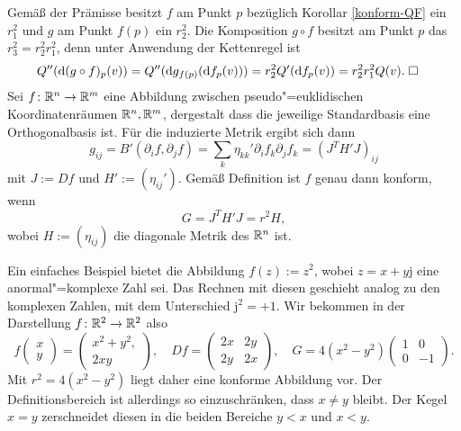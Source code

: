  Gemäß der Prämisse besitzt $f$ am Punkt $p$
bezüglich Korollar \ref{konform-QF} ein $r_1^2$ und $g$ am Punkt
$f(p)$ ein $r_2^2$. Die Komposition $g\circ f$ besitzt am
Punkt $p$ das $r_3^2 = r_2^2 r_1^2$, denn unter
Anwendung der Kettenregel ist
\begin{align}
Q''(\mathrm d(g\circ f)_p(v)) &=
Q''(\mathrm dg_{f(p)}(\mathrm df_p(v)))
= r_2^2 Q'(\mathrm df_p(v))
= r_2^2 r_1^2 Q(v).\;\Box
\end{align}
Sei $f\colon\mathbb R^n\to\mathbb R^m$ eine Abbildung zwischen pseudo"=euklidischen
Koordinatenräumen $\mathbb R^n,\mathbb R^m$, dergestalt dass die jeweilige
Standardbasis eine Orthogonalbasis ist. Für die induzierte Metrik
ergibt sich dann
\begin{equation}
g_{ij} = B'(\partial_i f,\partial_j f)
= \sum_{k} \eta_{kk}'\partial_i f_k\partial_j f_k
= (J^T H' J)_{ij}
\end{equation}
mit $J:=Df$ und $H':=(\eta_{ij}')$. Gemäß Definition ist $f$ genau
dann konform, wenn
\begin{equation}
G = J^T H' J = r^2 H,
\end{equation}
wobei $H:=(\eta_{ij})$ die diagonale Metrik des $\mathbb R^n$ ist.

Ein einfaches Beispiel bietet die Abbildung $f(z):=z^2$, wobei
$z=x+y\mathrm j$ eine anormal"=komplexe Zahl sei. Das Rechnen mit
diesen geschieht analog zu den komplexen Zahlen, mit dem Unterschied
$\mathrm j^2=+1$. Wir bekommen in der Darstellung $f\colon\mathbb R^2\to\mathbb R^2$
also
\begin{equation}
f\begin{pmatrix}x\\ y\end{pmatrix}
= \begin{pmatrix}x^2 + y^2,\\ 2xy\end{pmatrix},
\quad Df = \begin{pmatrix}2x & 2y \\ 2y & 2x\end{pmatrix},
\quad G = 4(x^2-y^2)\begin{pmatrix}1 & 0\\ 0 & -1\end{pmatrix}.
\end{equation}
Mit $r^2 = 4(x^2-y^2)$ liegt daher eine konforme Abbildung vor.
Der Definitionsbereich ist allerdings so einzuschränken,
dass $x\ne y$ bleibt. Der Kegel $x=y$ zerschneidet diesen
in die beiden Bereiche $y<x$ und $x<y$.

